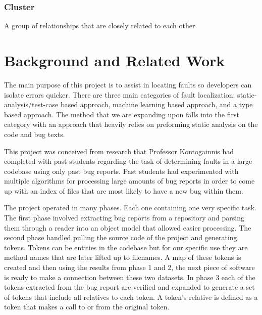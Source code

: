 \documentclass[12pt]{article}
\begin{document}
\hypertarget{cluster}{%
\subsubsection{Cluster}\label{cluster}}

A group of relationships that are closely related to each other

\hypertarget{background-and-related-work}{%
\section{Background and Related
Work}\label{background-and-related-work}}

The main purpose of this project is to assist in locating faults so
developers can isolate errors quicker. There are three main categories
of fault localization: static-analysis/test-case based approach, machine
learning based approach, and a type based approach. The method that we
are expanding upon falls into the first category with an approach that
heavily relies on preforming static analysis on the code and bug texts.

This project was conceived from research that Professor Kontogainnis had
completed with past students regarding the task of determining faults in
a large codebase using only past bug reports. Past students had
experimented with multiple algorithms for processing large amounts of
bug reports in order to come up with an index of files that are most
likely to have a new bug within them.

The project operated in many phases. Each one containing one very
specific task. The first phase involved extracting bug reports from a
repository and parsing them through a reader into an object model that
allowed easier processing. The second phase handled pulling the source
code of the project and generating tokens. Tokens can be entities in the
codebase but for our specific use they are method names that are later
lifted up to filenames. A map of these tokens is created and then using
the results from phase 1 and 2, the next piece of software is ready to
make a connection between these two datasets. In phase 3 each of the
tokens extracted from the bug report are verified and expanded to
generate a set of tokens that include all relatives to each token. A
token's relative is defined as a token that makes a call to or from the
original token.
\end{document}
